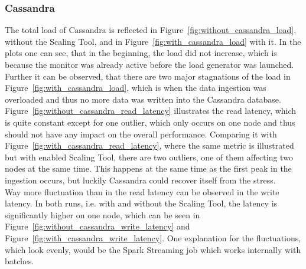 

\subsubsection{Cassandra}
The total load of Cassandra is reflected in Figure~\ref{fig:without_cassandra_load}, without the Scaling Tool, and in Figure~\ref{fig:with_cassandra_load} with it.
In the plots one can see, that in the beginning, the load did not increase, which is because the monitor was already active before the load generator was launched.
Further it can be observed, that there are two major stagnations of the load in Figure~\ref{fig:with_cassandra_load}, which is when the data ingestion was overloaded and thus no more data was written into the Cassandra database.\\
Figure~\ref{fig:without_cassandra_read_latency} illustrates the read latency, which is quite constant except for one outlier, which only occurs on one node and thus should not have any impact on the overall performance.
Comparing it with Figure~\ref{fig:with_cassandra_read_latency}, where the same metric is illustrated but with enabled Scaling Tool, there are two outliers, one of them affecting two nodes at the same time.
This happens at the same time as the first peak in the ingestion occurs, but luckily Cassandra could recover itself from the stress.\\

Way more fluctuation than in the read latency can be observed in the write latency.
In both runs, i.e. with and without the Scaling Tool, the latency is significantly higher on one node, which can be seen in Figure~\ref{fig:without_cassandra_write_latency} and Figure~\ref{fig:with_cassandra_write_latency}.
One explanation for the fluctuations, which look evenly, would be the Spark Streaming job which works internally with batches.


